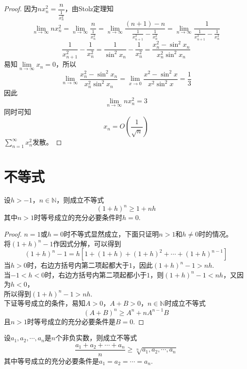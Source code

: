 \begin{proof}

    因为$nx_n^2 = \dfrac{n}{\frac{1}{x_n^2}}$，由\textup{Stolz}定理知
    $$\lim\limits_{n \to\infty}{nx_n^2} = \lim\limits_{n\to\infty}{\dfrac{n}{\frac{1}{x_n^2}}} = \lim\limits_{n \to \infty}{\dfrac{(n + 1) - n}{\frac{1}{x_{n + 1}^2} - \frac{1}{x_n^2}}} = \lim\limits_{n \to \infty}{\dfrac{1}{\frac{1}{x_{n + 1}^2} - \frac{1}{x_n^2}}}$$
    $$\dfrac{1}{x_{n + 1}^2} - \dfrac{1}{x_n^2} = \dfrac{1}{\sin^2 x_n} - \dfrac{1}{x_n^2} = \dfrac{x_n^2 - \sin^2 x_n}{x_n^2 \sin^2 x_n}$$
    易知$\lim\limits_{n\to\infty}{x_n} = 0$，所以
    $$\lim\limits_{n \to \infty}{\dfrac{x_n^2 - \sin^2 x_n}{x_n^2 \sin^2 x_n}} = \lim\limits_{x \to 0}{\dfrac{x^2 - \sin^2 x}{x^2 \sin^2 x}} = \dfrac{1}{3}$$
    因此
    $$\lim\limits_{n \to\infty}{nx_n^2} = 3$$
    同时可知
    $$x_n = O(\dfrac{1}{\sqrt{n}})$$
    $\sum\limits_{n = 1}^{\infty}{x_n^2}$发散。

\end{proof}

\section{不等式}

\begin{theorem}[Bernoulli不等式]

    设$h>-1$，$n\in\mathbb{N}$，则成立不等式
    $$(1+h)^n\geq1+nh$$
    其中$n>1$时等号成立的充分必要条件时$h=0$.

\end{theorem}

\begin{proof}
    
    $n=1$或$h=0$时不等式显然成立，下面只证明$n>1$和$h\neq 0$时的情况。\\
    将$(1+h)^n-1$作因式分解，可以得到
    $$(1+h)^n-1=h[1+(1+h)+(1+h)^2+\cdots+(1+h)^{n-1}]$$
    当$h>0$时，右边方括号内第二项起都大于$1$，因此$(1+h)^n-1>nh$.\\
    当$-1<h<0$时，右边方括号内第二项起都小于$1$，则$(1+h)^n-1<nh$，又因为$h<0$，\\
    所以得到$(1+h)^n-1>nh$.\\
    下证等号成立的条件，易知$A>0$，$A+B>0$，$n\in\mathbb{N}$时成立不等式
    $$(A+B)^n\geq A^n + nA^{n-1}B$$
    且$n>1$时等号成立的充分必要条件是$B=0$.

\end{proof}

\begin{theorem}
    
    设$a_1,a_2,\cdots,a_n$是$n$个非负实数，则成立不等式
    $$\dfrac{a_1+a_2+\cdots+a_n}{n}\geq \sqrt[n]{a_1,a_2,\cdots,a_n}$$
    其中等号成立的充分必要条件是$a_1=a_2=\cdots=a_n$.

\end{theorem}

